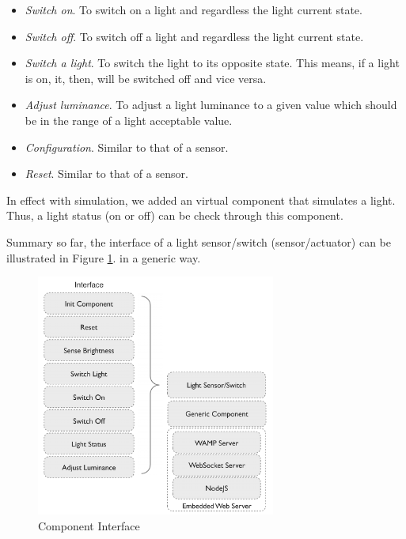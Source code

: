 \begin{itemize}
\setlength{\itemsep}{0pt}
\item \emph{Switch on}. To switch on a light and regardless the light current state.
\item \emph{Switch off}. To switch off a light and regardless the light current state.
\item \emph{Switch a light}. To switch the light to its opposite state. This means, if a light is on, it, then, will be switched off and vice versa.
\item \emph{Adjust luminance}. To adjust a light luminance to a given value which should be in the range of a light acceptable value.
\item \emph{Configuration}. Similar to that of a sensor.
\item \emph{Reset}. Similar to that of a sensor.
\end{itemize}

In effect with simulation, we added an virtual component that simulates a light. Thus, a light status (on or off) can be check through this component. 

Summary so far, the interface of a light sensor/switch (sensor/actuator) can be illustrated in Figure \ref{fig:component-interface}. in a generic way.

\begin{figure}[t]
  \begin{center}
    \includegraphics[width=0.7\textwidth]{images/component-interface.pdf}
    \caption{Component Interface}
    \label{fig:component-interface}
  \end{center}
\end{figure}

